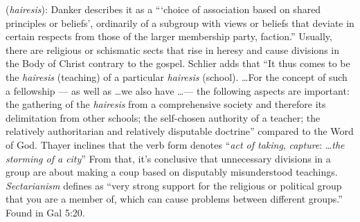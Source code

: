 \item[Sectarianism,]

(\textit{hairesis}):
Danker describes it as a ```choice of association based on shared principles or beliefs', ordinarily of a subgroup with views or beliefs that deviate in certain respects from those of the larger membership party, faction.'' Usually, there are religious or schismatic sects that rise in heresy and cause divisions in the Body of Christ contrary to the gospel. Schlier adds that ``It thus comes to be the \emph{hairesis} (teaching) of a particular \emph{hairesis} (school). \ldots For the concept of such a fellowship --- as well as \ldots we also have \ldots --- the following aspects are important: the gathering of the \emph{hairesis} from a comprehensive society and therefore its delimitation from other schools; the self-chosen authority of a teacher; the relatively authoritarian and relatively disputable doctrine'' compared to the Word of God. 
Thayer inclines that the verb form  denotes ``\emph{act of taking}, \emph{capture}: \ldots \emph{the storming of a city}'' From that, it's conclusive that unnecessary divisions in a group are about making a coup based on disputably misunderstood teachings. \emph{Sectarianism} defines as ``very strong support for the religious or political group that you are a member of, which can cause problems between different groups.''
Found in Gal 5:20.




